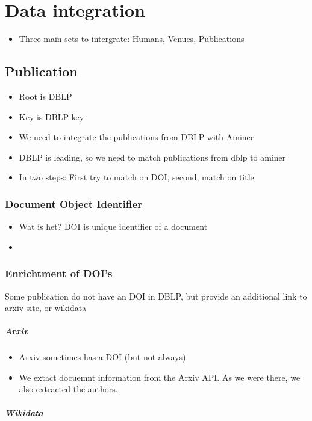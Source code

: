 \documentclass{ou-report}
\newcommand{\outline}[1]{{\color{blue} #1}}
\begin{document}
\chapter{Data integration}
\outline{
    \begin{itemize}
        \item Three main sets to intergrate: Humans, Venues, Publications
    \end{itemize}
    \section{Publication}
    \begin{itemize}
        \item Root is DBLP
        \item Key is DBLP key
        \item We need to integrate the publications from DBLP with Aminer
        \item DBLP is leading, so we need to match publications from dblp to aminer
        \item In two steps: First try to match on DOI, second, match on title
    \end{itemize}
    \subsection{Document Object Identifier}
    \begin{itemize}
        \item Wat is het? DOI is unique identifier of a document
        \item 
    \end{itemize} 
    \subsection{Enrichtment of DOI's}
    Some publication do not have an DOI in DBLP, but provide an additional link to arxiv site, or wikidata
    \paragraph{Arxiv}
    \begin{itemize}
        \item Arxiv sometimes has a DOI (but not always).
        \item We extact docuemnt information from the Arxiv API. As we were there, we also extracted the authors.
    \end{itemize}
    \paragraph{Wikidata}
}
\end{document}
